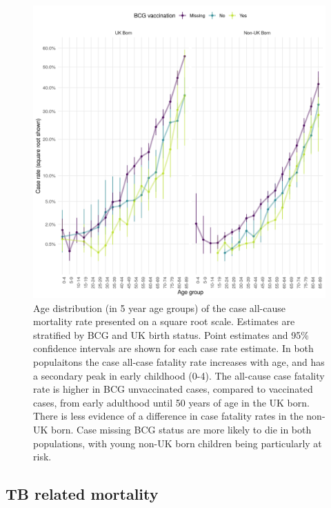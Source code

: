 \documentclass[11pt,twoside]{bristolthesis}
\begin{document}
  \begin{figure}
  
  {\centering \includegraphics[width=0.8\linewidth,]{chapters/tb-epi-england/figures/plot-all-mort-age-dist} 
  
  }
  
  \caption[Age distribution (in 5 year age groups) of the case all-cause mortality rate presented on a square root scale.]{Age distribution (in 5 year age groups) of the case all-cause mortality rate presented on a square root scale. Estimates are stratified by BCG and UK birth status. Point estimates and 95\%  confidence intervals are shown for each case rate estimate. In both populaitons the case all-case fatality rate increases with age, and has a secondary peak in early childhood (0-4). The all-cause case fatality rate is higher in BCG unvaccinated cases, compared to vaccinated cases, from early adulthood until 50 years of age in the UK born. There is less evidence of a difference in case fatality rates in the non-UK born. Case missing BCG status are more likely to die in both populations, with young non-UK born children being particularly at risk.}\label{fig:plot-all-mort-age-dist}
  \end{figure}
  \hypertarget{tb-related-mortality}{%
  \subsection{TB related mortality}\label{tb-related-mortality}}
  
\end{document}
